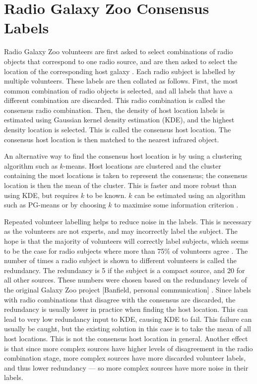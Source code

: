 \documentclass[11pt]{book}
\begin{document}
\section{Radio Galaxy Zoo Consensus Labels}
\label{sec:consensuses}
    
    Radio Galaxy Zoo volunteers are first asked to select combinations of radio objects that correspond to one radio source, and are then asked to select the location of the corresponding host galaxy \cite{banfield15}. Each radio subject is labelled by multiple volunteers. These labels are then collated as follows. First, the most common combination of radio objects is selected, and all labels that have a different combination are discarded. This radio combination is called the consensus radio combination. Then, the density of host location labels is estimated using Gaussian kernel density estimation (KDE), and the highest density location is selected. This is called the consensus host location. The consensus host location is then matched to the nearest infrared object.

    An alternative way to find the consensus host location is by using a clustering algorithm such as $k$-means. Host locations are clustered and the cluster containing the most locations is taken to represent the consensus; the consensus location is then the mean of the cluster. This is faster and more robust than using KDE, but requires $k$ to be known. $k$ can be estimated using an algorithm such as PG-means \cite{hamerly07} or by choosing $k$ to maximise some information criterion .

    Repeated volunteer labelling helps to reduce noise in the labels. This is necessary as the volunteers are not experts, and may incorrectly label the subject. The hope is that the majority of volunteers will correctly label subjects, which seems to be the case for radio subjects where more than 75\% of volunteers agree \cite{banfield15}. The number of times a radio subject is shown to different volunteers is called the redundancy. The redundancy is 5 if the subject is a compact source, and 20 for all other sources. These numbers were chosen based on the redundancy levels of the original Galaxy Zoo project [Banfield, personal communication] . Since labels with radio combinations that disagree with the consensus are discarded, the redundancy is usually lower in practice when finding the host location. This can lead to very low redundancy input to KDE, causing KDE to fail. This failure can usually be caught, but the existing solution in this case is to take the mean of all host locations. This is not the consensus host location in general. Another effect is that since more complex sources have higher levels of disagreement in the radio combination stage, more complex sources have more discarded volunteer labels, and thus lower redundancy --- so more complex sources have more noise in their labels.
\end{document}
